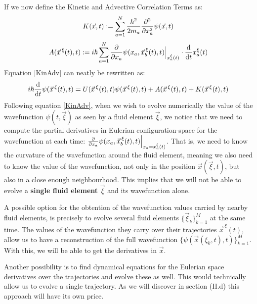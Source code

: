 \documentclass[11pt, a4paper]{article} %
\begin{document}
If we now define the Kinetic and Advective Correlation Terms as:\vspace{-0.1cm}
\begin{equation}\label{Kin}
K(\vec{x},t):=\sum_{a=1}^N \frac{\hbar^2}{2m_a}\pdv[2]{}{x_a}\psi(\vec{x},t)
\end{equation}\vspace{-0.1cm}
\begin{equation}\label{Adv}
A(\vec{x}^{\, \xi}(t),t):=i\hbar \sum_{a=1}^N \pdv{}{x_a}\psi(x_a,\vec{x}_b^{\, \xi}(t), t)\Big\rvert_{x^\xi_a(t)}\cdot \dv{}{t}x^\xi_a(t)
\end{equation}
Equation \eqref{KinAdv} can neatly be rewritten as:\vspace{-0.1cm}
\begin{equation}
i\hbar \dv{}{t}\psi(\vec{x}^{\, \xi}(t),t)=U(\vec{x}^{\, \xi}(t),t)\psi(\vec{x}^{\, \xi}(t),t)+A(\vec{x}^{\, \xi}(t),t)+K(\vec{x}^{\, \xi}(t),t)\vspace{-0.1cm}
\end{equation}
Following equation \eqref{KinAdv}, when we wish to evolve numerically the value of the wavefunction  $\psi(t,\vec{\xi})$ as seen by a fluid element $\vec{\xi}$, we notice that we need to compute the partial derivatives in Eulerian configuration-space for the wavefunction at each time: $\pdv{}{x_a}\psi(x_a,\vec{x}_b^{\, \xi}(t), t)\Big\rvert_{x_a=x^\xi_a(t)}$. That is, we need to know the curvature of the wavefunction around the fluid element, meaning we also need to know the value of the wavefunction, not only in the position $\vec{x}(\vec{\xi},t)$, but also in a close enough neighbourhood. This implies that we will not be able to evolve a {\bf single fluid element} $\vec{\xi}$ and its wavefunction alone. 

A possible option for the obtention of the wavefunction values carried by nearby fluid elements, is precisely to evolve several fluid elements $\{\vec{\xi}_k\}_{k=1}^M$ at the same time. The values of the wavefunction they carry over their trajectories $\vec{x}^{\, \xi}(t)$, allow us to have a reconstruction of the full wavefunction $\{\psi(\vec{x}(\xi_k,t),t) \}_{k=1}^M$. With this, we will be able to get the derivatives in $\vec{x}$.\vspace{-0.1cm}

Another possibility is to find dynamical equations for the Eulerian space derivatives over the trajectories and evolve these as well. This would technically allow us to evolve a single trajectory. As we will discover in section (II.d) this approach will have its own price.\vspace{-0.1cm}
\end{document}
